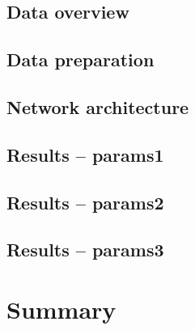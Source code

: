 \documentclass{pracalicmgr2021}
\begin{document}
    \section{Data overview}
    
    \section{Data preparation}
    
    \section{Network architecture}
    
    \section{Results -- params1}
    
    \section{Results -- params2}
    
    \section{Results -- params3}
    
    
    \chapter{Summary}
    

        

  
        
        
\end{document}
